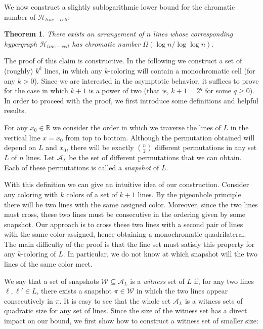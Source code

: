 \documentclass[11pt,a4paper]{article}
\newtheorem{theorem}{Theorem}
\newcommand{\Hlinecell}{{\mathcal H}_{line-cell}}
\begin{document}
We now construct a slightly sublogarithmic lower bound for the chromatic number of $\Hlinecell$:

\begin{theorem}
\label{LB:chroma}
There exists an arrangement of $n$ lines whose corresponding hypergraph $\Hlinecell$  has chromatic number $\Omega(\log n /\log \log n)$.
\end{theorem}
The proof of this claim is constructive. In the following we construct a set of (roughly) $k^k$ lines, in which any $k$-coloring will contain a monochromatic cell (for any $k>0$).  Since we are interested in the asymptotic behavior, it suffices to prove for the case in which $k+1$ is a power of two (that is, $k+1=2^q$ for some $q\geq 0$). In order to proceed with the proof, we first introduce some definitions and helpful results.


For any $x_0\in \mathbb{R}$ we consider the order in which we traverse the lines of $L$ in the vertical line $x=x_0$ from top to bottom. Although the permutation obtained will depend on $L$ and $x_0$, there will be exactly $n\choose 2$ different permutations in any set $L$ of $n$ lines. Let $\mathcal{A}_L$ be the set of different permutations that we can obtain. Each of these permutations is called a {\em snapshot} of $L$.


With this definition we can give an intuitive idea of our construction. Consider any coloring with $k$ colors of a set of $k+1$ lines. By the pigeonhole principle there will be two lines with the same assigned color. Moreover, since the two lines must cross, these two lines must be consecutive in the ordering given by some snapshot. Our approach is to cross these two lines with a second pair of lines with the same color assigned, hence obtaining a monochromatic quadrilateral. The main difficulty of the proof is that the line set must satisfy this property for any $k$-coloring of $L$. In particular, we do not know at which snapshot will the two lines of the same color meet.

We say that a set of snapshots $\mathcal{W} \subseteq \mathcal{A}_L$ is a {\em witness} set of $L$ if, for any two lines $\ell,\ell'\in L$, there exists a snapshot $\pi\in \mathcal{W}$ in which the two lines appear consecutively in $\pi$. It is easy to see that the whole set $\mathcal{A}_L$ is a witness sets of quadratic size for any set of lines. Since the size of the witness set has a direct impact on our bound, we first show how to construct a witness set of smaller size:
\end{document}
